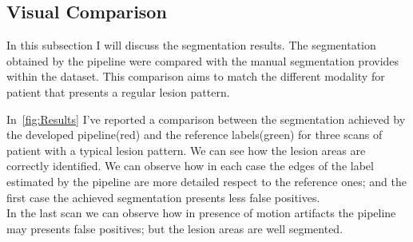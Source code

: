 \documentclass{standalone}
\begin{document}
	\subsection{Visual Comparison}
	
	In this subsection I will discuss the segmentation results. The segmentation obtained by the pipeline were compared with the manual segmentation provides within the dataset. This comparison aims to match the different modality for patient that presents a regular lesion pattern. 
	


	In \figurename\,\ref{fig:Results} I've reported a comparison between the segmentation achieved by the developed pipeline(red) and the reference labels(green) for three scans of patient with a typical lesion pattern. We can see how the lesion areas are correctly identified. We can observe how in each case the edges of the label estimated by the pipeline are more detailed respect to the reference ones; and the first case the achieved segmentation presents less false positives.\\ In the last scan we can observe how in presence of motion artifacts the pipeline may presents false positives; but the lesion areas are well segmented.
	
	
\end{document}
